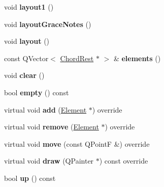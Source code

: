 \begin{DoxyCompactItemize}
\item 
\mbox{\label{class_ms_1_1_beam_aeab5dbce17b6f48fd75b63b46c6a426b}} 
void {\bfseries layout1} ()
\item 
\mbox{\label{class_ms_1_1_beam_a7952d1966f3d3b451d8d796a6958a5c3}} 
void {\bfseries layout\+Grace\+Notes} ()
\item 
\mbox{\label{class_ms_1_1_beam_ac2c76daf5a9dc4c3cc0f366a394ab4d6}} 
void {\bfseries layout} ()
\item 
\mbox{\label{class_ms_1_1_beam_a6dadfb1b4b373eb11485cc8372cb0edd}} 
const Q\+Vector$<$ \hyperlink{class_ms_1_1_chord_rest}{Chord\+Rest} $\ast$ $>$ \& {\bfseries elements} ()
\item 
\mbox{\label{class_ms_1_1_beam_a5d3b0a90a95a0b029200b6c5a7be9cab}} 
void {\bfseries clear} ()
\item 
\mbox{\label{class_ms_1_1_beam_a72a14925e0ad058c6e5f1f2189884bd5}} 
bool {\bfseries empty} () const
\item 
\mbox{\label{class_ms_1_1_beam_a992a7da1c28a530754bfa2cf5cde85a1}} 
virtual void {\bfseries add} (\hyperlink{class_ms_1_1_element}{Element} $\ast$) override
\item 
\mbox{\label{class_ms_1_1_beam_a4f5daff6903a9f441d569593c600722a}} 
virtual void {\bfseries remove} (\hyperlink{class_ms_1_1_element}{Element} $\ast$) override
\item 
\mbox{\label{class_ms_1_1_beam_a87f9a2bfc30195b8d1aa711d8717e7fa}} 
virtual void {\bfseries move} (const Q\+PointF \&) override
\item 
\mbox{\label{class_ms_1_1_beam_abd65f0bdfb146e7c37e8de86d43d0a58}} 
virtual void {\bfseries draw} (Q\+Painter $\ast$) const override
\item 
\mbox{\label{class_ms_1_1_beam_a5f566745948af534def31a1777d18ebf}} 
bool {\bfseries up} () const
\item 

\end{DoxyCompactItemize}
